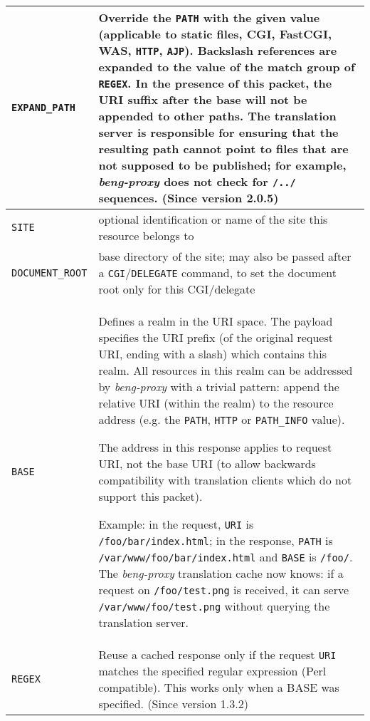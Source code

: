 \documentclass[a4paper,12pt]{article}
\begin{document}
\begin{longtable}{|l|p{8cm}|}
\hline

\verb|EXPAND_PATH| & Override the \verb|PATH| with the given value
(applicable to static files, CGI, FastCGI, WAS, \verb|HTTP|,
\verb|AJP|).
Backslash references are expanded to the value of the match group of
\verb|REGEX|. In the presence of this packet, the URI suffix after the
base will not be appended to other paths.
The translation server is responsible for ensuring that the resulting
path cannot point to files that are not supposed to be published; for
example, \emph{beng-proxy} does not check for \texttt{/../} sequences.
\scriptsize{(Since version 2.0.5)} \\

\hline

\verb|SITE| & optional identification or name of the site this
resource belongs to \\

\hline

\verb|DOCUMENT_ROOT| & base directory of the site; may also be
passed after a \verb|CGI|/\verb|DELEGATE| command, to set the
document root only for this CGI/delegate \\

\hline

\verb|BASE| & Defines a realm in the URI space.  The payload
specifies the URI prefix (of the original request URI, ending with a
slash) which contains this
realm.  All resources in this realm can be addressed by
\emph{beng-proxy} with a trivial pattern: append the relative URI
(within the realm) to the resource address (e.g. the \verb|PATH|,
\verb|HTTP| or \verb|PATH_INFO| value).

The address in this response applies to request URI, not the
base URI (to allow backwards compatibility with translation clients
which do not support this packet).

Example: in the request, \verb|URI| is \texttt{/foo/bar/index.html};
in the response, \verb|PATH| is \texttt{/var/www/foo/bar/index.html}
and \verb|BASE| is \texttt{/foo/}.  The \emph{beng-proxy}
translation cache now knows: if a request on \texttt{/foo/test.png} is
received, it can serve \texttt{/var/www/foo/test.png} without querying
the translation server. \\

\hline

\verb|REGEX| & Reuse a cached response only if the request \verb|URI|
matches the specified regular expression (Perl compatible).  This
works only when a BASE was specified.
\scriptsize{(Since version 1.3.2)} \\


\end{longtable}
\end{document}
